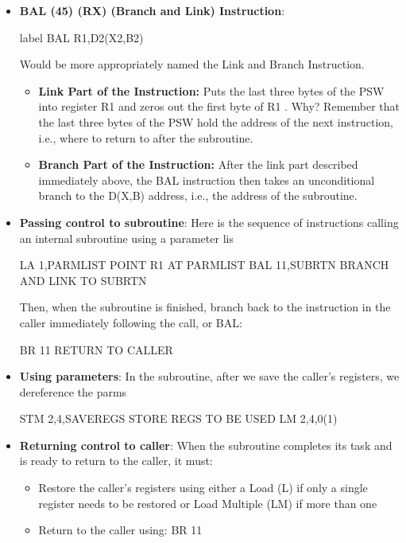 \documentclass{report}
\begin{document}
\begin{itemize}
        \item \textbf{BAL (45) (RX) (Branch and Link) Instruction}:
            \bigbreak \noindent 
            \begin{cppcode}
            label BAL R1,D2(X2,B2)
            \end{cppcode}
            \bigbreak \noindent 
            Would be more appropriately named the Link and Branch Instruction.
            \bigbreak \noindent 
            \begin{itemize}
                \item \textbf{Link Part of the Instruction:} Puts the last three bytes of the PSW into register R1 and zeros out the first byte of R1 . Why?
                \bigbreak \noindent 
                Remember that the last three bytes of the PSW hold the address of the next instruction, i.e., where to return to after the subroutine.
                \item \textbf{Branch Part of the Instruction:} After the link part described immediately above, the BAL instruction then takes an unconditional branch to the D(X,B) address, i.e., the address of the subroutine.
            \end{itemize}
        \item \textbf{Passing control to subroutine}: Here is the sequence of instructions calling an internal subroutine using a parameter lis
            \bigbreak \noindent 
            \begin{cppcode}
                LA 1,PARMLIST POINT R1 AT PARMLIST
                BAL 11,SUBRTN BRANCH AND LINK TO SUBRTN
            \end{cppcode}
            \bigbreak \noindent 
            Then, when the subroutine is finished, branch back to the instruction in the caller immediately following the call, or BAL:
            \bigbreak \noindent 
            \begin{cppcode}
            BR 11 RETURN TO CALLER
            \end{cppcode}
        \item \textbf{Using parameters}: In the subroutine, after we save the caller's registers, we dereference the parms
            \bigbreak \noindent 
            \begin{cppcode}
                STM   2,4,SAVEREGS   STORE REGS TO BE USED
                LM    2,4,0(1)
            \end{cppcode}
        \item \textbf{Returning control to caller}: When the subroutine completes its task and is ready to return to the caller, it must:
            \bigbreak \noindent 
            \begin{itemize}
                \item Restore the caller's registers using either a Load (L) if only a single register needs to be restored or Load Multiple (LM) if more than one
                \item Return to the caller using: BR 11
            \end{itemize}

    \end{itemize}
\end{document}
